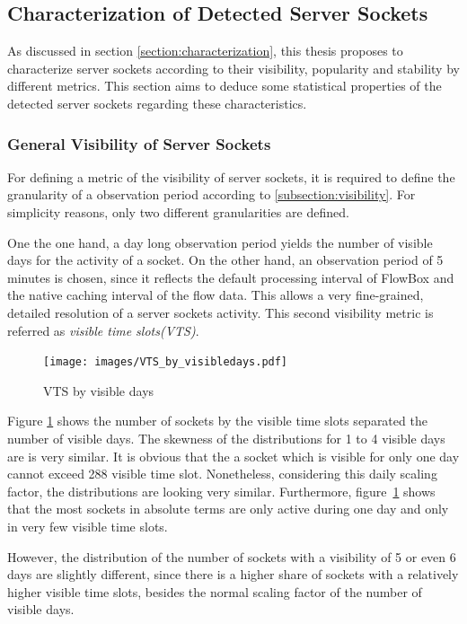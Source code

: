 \newpage
\subsection{Characterization of Detected Server Sockets}

As discussed in section \ref{section:characterization}, this thesis proposes to
characterize \glspl{server socket} according to their visibility, popularity and
stability by different metrics. This section aims to deduce some statistical
properties of the detected \glspl{server socket} regarding these
characteristics.

\subsubsection{General Visibility of Server Sockets}

For defining a metric of the visibility of \glspl{server socket}, it is required
to define the granularity of a observation period according to
\ref{subsection:visibility}. For simplicity reasons, only two different
granularities are defined.

One the one hand, a day long observation period yields the number of visible
days for the activity of a socket. On the other hand, an observation period of 5
minutes is chosen, since it reflects the default processing interval of FlowBox
and the native caching interval of the flow data. This allows a very
fine-grained, detailed resolution of a \glspl{server socket} activity. This
second visibility metric is referred as \emph{visible time slots(VTS)}.

\begin{figure}
	[hb] \centering
	\texttt{[image: images/VTS\_by\_visibledays.pdf]}
	\caption{VTS by visible days}
	\label{fig:vts_by_visibledays}
\end{figure}

Figure \ref{fig:vts_by_visibledays} shows the number of sockets by the visible
time slots separated the number of visible days. The skewness of the
distributions for 1 to 4 visible days are is very similar. It is obvious that
the a socket which is visible for only one day cannot exceed 288 visible time
slot. Nonetheless, considering this daily scaling factor, the distributions are
looking very similar. Furthermore, figure \ref{fig:vts_by_visibledays} shows
that the most sockets in absolute terms are only active during one day and only
in very few visible time slots.

However, the distribution of the number of sockets with a visibility of 5 or
even 6 days are slightly different, since there is a higher share of sockets
with a relatively higher visible time slots, besides the normal scaling factor
of the number of visible days.

